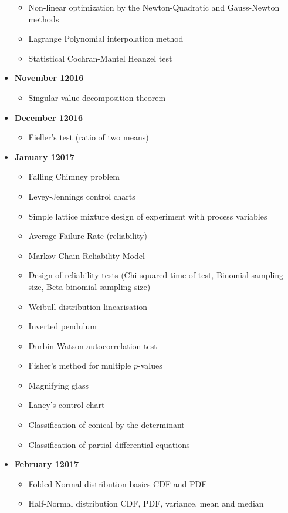 \begin{itemize}
\begin{itemize}[noitemsep]
			\item Non-linear optimization by the Newton-Quadratic and Gauss-Newton methods
			\item Lagrange Polynomial interpolation method
			\item Statistical Cochran-Mantel Heanzel test
		\end{itemize}
	\item \textbf{November 12016}
		\begin{itemize}[noitemsep]
			\item Singular value decomposition theorem
		\end{itemize}
	\item \textbf{December 12016}
		\begin{itemize}[noitemsep]
			\item Fieller's test (ratio of two means)
		\end{itemize}
	\item \textbf{January 12017}
		\begin{itemize}[noitemsep]
			\item Falling Chimney problem
			\item Levey-Jennings control charts
			\item Simple lattice mixture design of experiment with process variables
			\item Average Failure Rate (reliability)
			\item Markov Chain Reliability Model
			\item Design of reliability tests (Chi-squared time of test, Binomial sampling size, Beta-binomial sampling size)
			\item Weibull distribution linearisation
			\item Inverted pendulum
			\item Durbin-Watson autocorrelation test
			\item Fisher's method for multiple $p$-values
			\item Magnifying glass
			\item Laney's control chart
			\item Classification of conical by the determinant	
			\item Classification of partial differential equations
		\end{itemize}
	\item \textbf{February 12017}
		\begin{itemize}[noitemsep]
			\item Folded Normal distribution basics CDF and PDF
			\item Half-Normal distribution CDF, PDF, variance, mean and median

\end{itemize}
\end{itemize}
